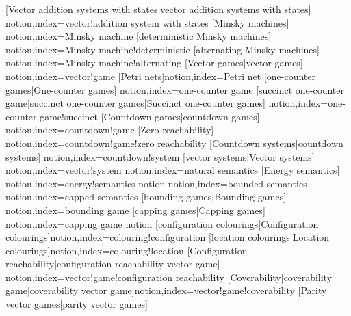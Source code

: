   [Vector addition systems with states|vector addition systems with states]
  {notion,index={vector!addition system with states}}
[Minsky machines]
  {notion,index={Minsky machine}}
[deterministic Minsky machines]
  {notion,index={Minsky machine!deterministic}}
[alternating Minsky machines]
  {notion,index={Minsky machine!alternating}}
  [Vector games|vector games]
  {notion,index={vector!game}}
[Petri nets]{notion,index={Petri net}}
[one-counter games|One-counter games]
  {notion,index={one-counter game}}
[succinct one-counter game|succinct one-counter games|Succinct one-counter games]
  {notion,index={one-counter game!succinct}}
[Countdown games|countdown games]
  {notion,index={countdown!game}}
[Zero reachability]
  {notion,index={countdown!game!zero reachability}}
[Countdown systems|countdown systems]
  {notion,index={countdown!system}}
  [vector systems|Vector systems]
  {notion,index={vector!system}}
  {notion,index={natural semantics}}
[Energy semantics]
  {notion,index={energy!semantics}}
  {notion}
  {notion,index={bounded semantics}}
  {notion,index={capped semantics}}
[bounding games|Bounding games]
  {notion,index={bounding game}}
[capping games|Capping games]
  {notion,index={capping game}}
  {notion}
[configuration
  colourings|Configuration
  colourings]{notion,index={colouring!configuration}}
[location colourings|Location
  colourings]{notion,index={colouring!location}}
[Configuration
reachability|configuration reachability vector game]
                    {notion,index={vector!game!configuration
  reachability}}
[Coverability|coverability game|coverability
  vector game]{notion,index={vector!game!coverability}}
[Parity vector games|parity vector games]
